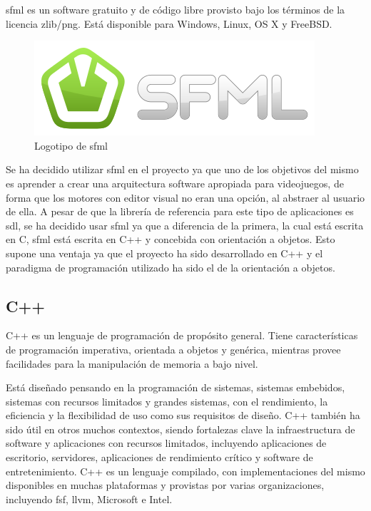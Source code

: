 		\acrshort{sfml} es un software gratuito y de código libre provisto bajo los términos de la licencia zlib/png. Está disponible para Windows, Linux, OS X y FreeBSD.

		\begin{figure}[!htp]
			 \centering
			 \includegraphics[scale=.8]{fig/sfml}
			 \caption{Logotipo de \acrshort{sfml}}
			 \label{fig:sfml}
		\end{figure}

		\FloatBarrier

		Se ha decidido utilizar \acrshort{sfml} en el proyecto ya que uno de los objetivos del mismo es aprender a crear una arquitectura software apropiada para videojuegos, de forma que los motores con editor visual no eran una opción, al abstraer al usuario de ella. A pesar de que la librería de referencia para este tipo de aplicaciones es \acrshort{sdl}, se ha decidido usar \acrshort{sfml} ya que a diferencia de la primera, la cual está escrita en C, \acrshort{sfml} está escrita en C++ y concebida con orientación a objetos. Esto supone una ventaja ya que el proyecto ha sido desarrollado en C++ y el paradigma de programación utilizado ha sido el de la orientación a objetos.

	\subsection{C++}

		C++ es un lenguaje de programación de propósito general. Tiene características de programación imperativa, orientada a objetos y genérica, mientras provee facilidades para la manipulación de memoria a bajo nivel.

		Está diseñado pensando en la programación de sistemas, sistemas embebidos, sistemas con recursos limitados y grandes sistemas, con el rendimiento, la eficiencia y la flexibilidad de uso como sus requisitos de diseño. C++ también ha sido útil en otros muchos contextos, siendo fortalezas clave la infraestructura de software y aplicaciones con recursos limitados, incluyendo aplicaciones de escritorio, servidores, aplicaciones de rendimiento crítico y software de entretenimiento. C++ es un lenguaje compilado, con implementaciones del mismo disponibles en muchas plataformas y provistas por varias organizaciones, incluyendo \acrshort{fsf}, \acrshort{llvm}, Microsoft e Intel.

